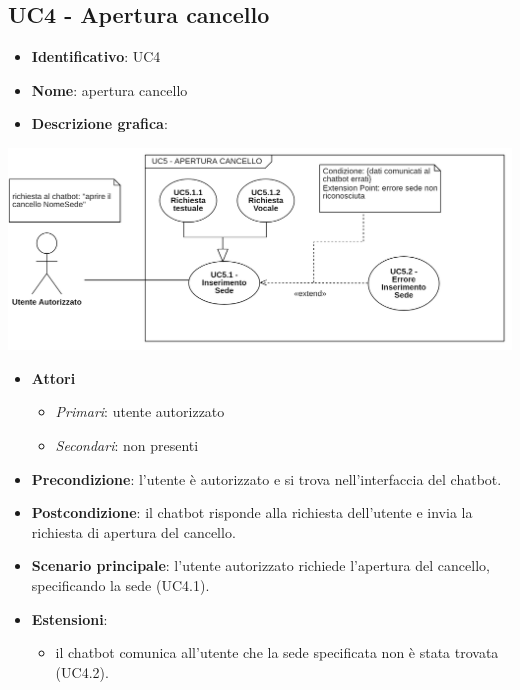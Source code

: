 \subsection{UC4 - Apertura cancello}
\begin{itemize}
    \item \textbf{Identificativo}: UC4
    \item \textbf{Nome}: apertura cancello
    \item \textbf{Descrizione grafica}:
\end{itemize}

\begin{center}
    \includegraphics{images/UC4.png} 
\end{center} 

 \begin{itemize}
    \item \textbf{Attori}
 \begin{itemize} 
    \item \textit{Primari}: utente autorizzato
    \item \textit{Secondari}: non presenti
 \end{itemize}
 \item \textbf{Precondizione}: l'utente è autorizzato e si trova nell'interfaccia del chatbot.
 \item \textbf{Postcondizione}: il chatbot risponde alla richiesta dell'utente e invia la richiesta di apertura del cancello.
 \item \textbf{Scenario principale}: l'utente autorizzato richiede l'apertura del cancello, specificando la sede (UC4.1).
 \item \textbf{Estensioni}: 
 \begin{itemize} 
    \item il chatbot comunica all'utente che la sede specificata non è stata trovata (UC4.2).
 \end{itemize}
\end{itemize}
\newpage
